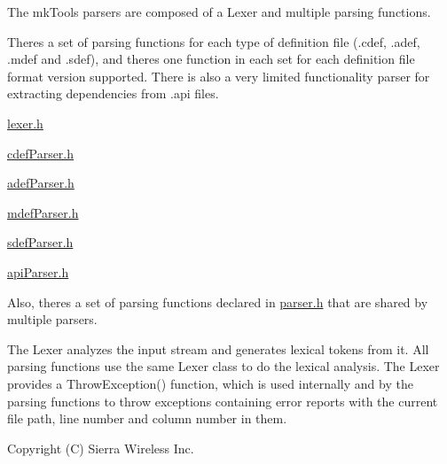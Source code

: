 The mk\+Tools parsers are composed of a Lexer and multiple parsing functions.

There\textquotesingle{}s a set of parsing functions for each type of definition file (.cdef, .adef, .mdef and .sdef), and there\textquotesingle{}s one function in each set for each definition file format version supported. There is also a very limited functionality parser for extracting dependencies from .api files.


\begin{DoxyItemize}
\item \hyperlink{lexer_8h}{lexer.\+h}
\item \hyperlink{cdef_parser_8h}{cdef\+Parser.\+h}
\item \hyperlink{adef_parser_8h}{adef\+Parser.\+h}
\item \hyperlink{mdef_parser_8h}{mdef\+Parser.\+h}
\item \hyperlink{sdef_parser_8h}{sdef\+Parser.\+h}
\item \hyperlink{api_parser_8h}{api\+Parser.\+h}
\end{DoxyItemize}

Also, there\textquotesingle{}s a set of parsing functions declared in \hyperlink{parser_8h}{parser.\+h} that are shared by multiple parsers.

The Lexer analyzes the input stream and generates lexical tokens from it. All parsing functions use the same Lexer class to do the lexical analysis. The Lexer provides a Throw\+Exception() function, which is used internally and by the parsing functions to throw exceptions containing error reports with the current file path, line number and column number in them.





Copyright (C) Sierra Wireless Inc. 